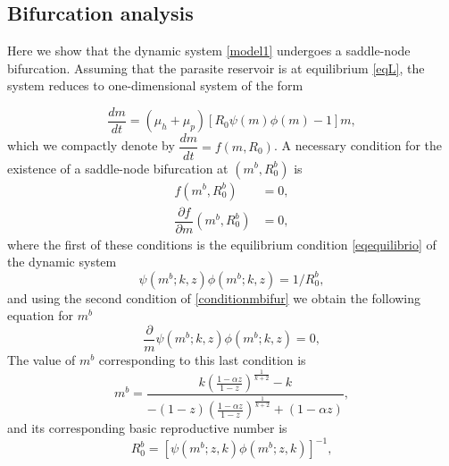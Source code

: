 \documentclass[eng]{MMSB-class-eng}
\begin{document}
{\subsection{Bifurcation analysis}\label{bifurcacion}

{\color{red}

Here we show that the dynamic system \eqref{model1} undergoes a saddle-node bifurcation. 
Assuming that the parasite reservoir is at equilibrium \eqref{eqL}, the system reduces to one-dimensional system of the form

\begin{equation*}
\dfrac{dm}{dt}=(\mu_h + \mu_p)\left[ R_0  \psi(m)\phi(m) -1 \right] m,%
\end{equation*}
which we compactly denote by
$\dfrac{dm}{dt}=f(m,R_0)$.
A necessary condition for the existence of a saddle-node bifurcation at 
$(m^{b},R_0^b)$ is
\begin{equation}\label{conditionmbifur}
\begin{split}
f(m^b,R_0^b)&=0,\\
\dfrac{\partial f}{\partial m}(m^b,R_0^b)&=0,
\end{split}
\end{equation}
where the first of these conditions is the equilibrium condition \eqref{eqequilibrio} of the dynamic system
\begin{equation*}
\psi(m^b;k,z)\phi(m^b;k,z)=1/R_0^b,
\end{equation*}
and using the second condition of \eqref{conditionmbifur} we obtain the following equation for $m^b$
\begin{equation}
\frac{\partial }{m}\psi(m^b;k,z)\phi(m^b;k,z)=0,	
\end{equation}
The value of $m^b$ corresponding to this last condition is
\begin{equation}
m^b=\dfrac{k\left( \frac{1-\alpha z}{1-z}\right)^{\frac{1}{k+2}} - k}{-(1-z)\left( \frac{1-\alpha z}{1-z}\right)^{\frac{1}{k+2}} + (1-\alpha z)},	
\end{equation}
and its corresponding basic reproductive number is
\begin{equation}
R_0^b=\left[ \psi(m^b;z,k)\phi(m^b;z,k)\right]^{-1},
\end{equation}	

}}
\end{document}
